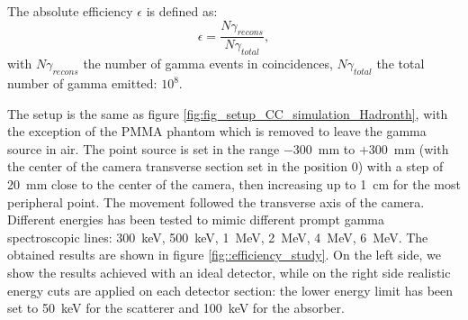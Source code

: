 The absolute efficiency $\epsilon$ is defined as:
\begin{equation}
\epsilon =\frac{N\gamma_{recons}}{N\gamma_{total}},
\end{equation}
\label{eq:equation_efficacite_absolue}
with $N\gamma_{recons}$ the number of gamma events in coincidences,\newline
\hspace*{1cm}$N\gamma_{total}$ the total number of gamma emitted: $10^8$.\newline

The setup is the same as figure \ref{fig:fig_setup_CC_simulation_Hadronth}, with the exception of the PMMA phantom which is removed to leave the gamma source in air.
The point source is set in the range $-300$~mm to $+300$~mm (with the center of the camera transverse section set in the position 0) with a step of 20~mm close to the center of the camera, then increasing up to 1~cm for the most peripheral point. The movement followed the transverse axis of the camera. Different energies has been tested to mimic different prompt gamma spectroscopic lines: 300~keV, 500~keV, 1~MeV, 2~MeV, 4~MeV, 6~MeV.\newline
The obtained results are shown in figure \ref{fig::efficiency_study}. On the left side, we show the results achieved with an ideal detector, while on the right side realistic energy cuts are applied on each detector section: the lower energy limit  has been set to 50~keV for the scatterer and 100~keV for the absorber.

